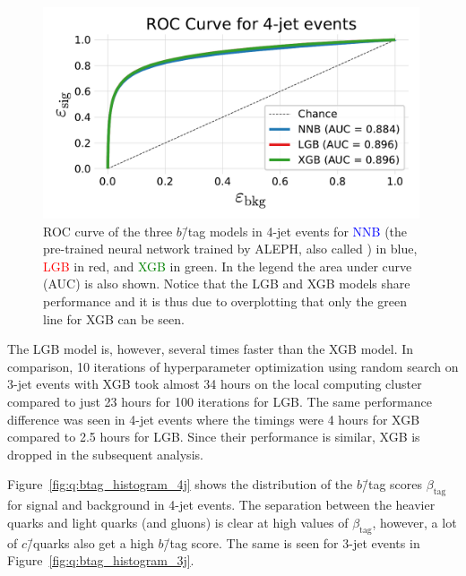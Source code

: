 \begin{figure}[h!]
  \vspace{-0.1cm}
  \centerfloat
  \includegraphics[width=0.99\textwidth, trim=10 10 10 40, clip]{figures/quarks/ROC_4_jet-down_sample=1.00-ML_vars=vertex-selection=b-ejet_min=4-n_iter_RS_lgb=99-n_iter_RS_xgb=9-cdot_cut=0.90-version=19.pdf}
  \caption[ROC Curve for 4-Jet $b$\=/Tagging]
          {ROC curve of the three $b$\=/tag models in 4-jet events for \textcolor{blue}{NNB} (the pre-trained neural network trained by ALEPH, also called ) in blue, \textcolor{red}{LGB} in red, and \textcolor{green}{XGB} in green. In the legend the area under curve (AUC) is also shown. Notice that the LGB and XGB models share performance and it is thus due to overplotting that only the green line for XGB can be seen. 
          } 
  \label{fig:q:roc_btag_4j}
\end{figure}
\vspace{-0.3cm}

The LGB model is, however, several times faster than the XGB model. In comparison, \num{10} iterations of hyperparameter optimization using random search on 3-jet events with XGB took almost \num{34} hours on the local computing cluster compared to just \num{23} hours for \num{100} iterations for LGB. The same performance difference was seen in 4-jet events where the timings were \num{4} hours for XGB compared to \num{2.5} hours for LGB. Since their performance is similar, XGB is dropped in the subsequent analysis. 

Figure~\ref{fig:q:btag_histogram_4j} shows the distribution of the $b$\=/tag scores $\beta_\mathrm{tag}$ for signal and background in 4-jet events. The separation between the heavier quarks and light quarks (and gluons) is clear at high values of $\beta_\mathrm{tag}$, however, a lot of $c$\=/quarks also get a high $b$\=/tag score. The same is seen for 3-jet events in Figure~\ref{fig:q:btag_histogram_3j}. 

